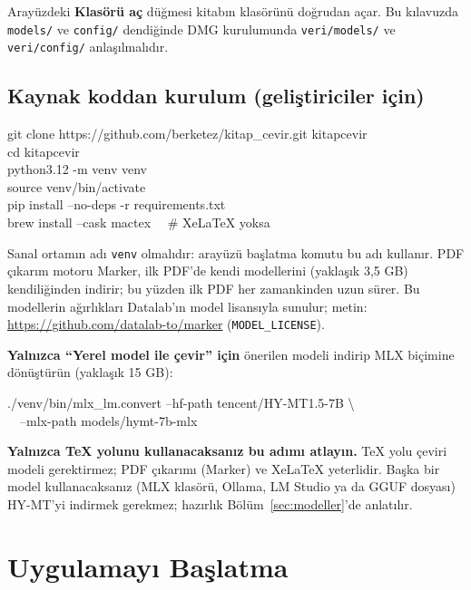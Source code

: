 \documentclass[11pt,a4paper]{article}
\newcommand{\dugme}[1]{\textsf{\bfseries #1}}
\newcommand{\dosya}[1]{\texttt{#1}}
\begin{document}
Arayüzdeki \dugme{Klasörü aç} düğmesi kitabın klasörünü doğrudan açar. Bu
kılavuzda \dosya{models/} ve \dosya{config/} dendiğinde DMG kurulumunda
\dosya{veri/models/} ve \dosya{veri/config/} anlaşılmalıdır.

\subsection{Kaynak koddan kurulum (geliştiriciler için)}\label{sec:kaynak}
\begin{komut}
git clone https://github.com/berketez/kitap\_cevir.git kitapcevir\\
cd kitapcevir\\
python3.12 -m venv venv\\
source venv/bin/activate\\
pip install --no-deps -r requirements.txt\\
brew install --cask mactex \ \ \# XeLaTeX yoksa
\end{komut}

Sanal ortamın adı \dosya{venv} olmalıdır: arayüzü başlatma komutu bu adı
kullanır. PDF çıkarım motoru Marker, ilk PDF'de kendi modellerini (yaklaşık
3,5 GB) kendiliğinden indirir; bu yüzden ilk PDF her zamankinden uzun sürer.
Bu modellerin ağırlıkları Datalab'ın model lisansıyla sunulur; metin:
\url{https://github.com/datalab-to/marker} (\dosya{MODEL\_LICENSE}).

\textbf{Yalnızca ``Yerel model ile çevir'' için} önerilen modeli indirip MLX
biçimine dönüştürün (yaklaşık 15 GB):

\begin{komut}
./venv/bin/mlx\_lm.convert --hf-path tencent/HY-MT1.5-7B \textbackslash\\
\ \ --mlx-path models/hymt-7b-mlx
\end{komut}

\begin{notkutu}
\textbf{Yalnızca TeX yolunu kullanacaksanız bu adımı atlayın.} TeX yolu
çeviri modeli gerektirmez; PDF çıkarımı (Marker) ve XeLaTeX yeterlidir.
Başka bir model kullanacaksanız (MLX klasörü, Ollama, LM Studio ya da GGUF
dosyası) HY-MT'yi indirmek gerekmez; hazırlık Bölüm~\ref{sec:modeller}'de
anlatılır.
\end{notkutu}

\section{Uygulamayı Başlatma}
\end{document}
